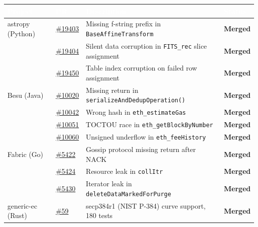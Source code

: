 \documentclass[11pt,a4paper]{article}
\begin{document}
\begin{center}
\begin{tabular}{|p{2.8cm}|p{1.3cm}|p{6.4cm}|p{1.8cm}|}
\hline
\rowcolor{tblheader}
\textcolor{white}{\bfseries Project} & \textcolor{white}{\bfseries PR} & \textcolor{white}{\bfseries Description} & \textcolor{white}{\bfseries Status} \\
\hline
\rowcolor{tblrowwhite}
astropy (Python) & \href{https://github.com/astropy/astropy/pull/19403}{\#19403} & Missing f-string prefix in \texttt{BaseAffineTransform} & \textbf{Merged} \\
\hline
\rowcolor{tblrowalt}
 & \href{https://github.com/astropy/astropy/pull/19404}{\#19404} & Silent data corruption in \texttt{FITS\_rec} slice assignment & \textbf{Merged} \\
\hline
\rowcolor{tblrowwhite}
 & \href{https://github.com/astropy/astropy/pull/19450}{\#19450} & Table index corruption on failed row assignment & \textbf{Merged} \\
\hline
\rowcolor{tblrowalt}
Besu (Java) & \href{https://github.com/hyperledger/besu/pull/10020}{\#10020} & Missing return in \texttt{serializeAndDedupOperation()} & \textbf{Merged} \\
\hline
\rowcolor{tblrowwhite}
 & \href{https://github.com/hyperledger/besu/pull/10042}{\#10042} & Wrong hash in \texttt{eth\_estimateGas} & \textbf{Merged} \\
\hline
\rowcolor{tblrowalt}
 & \href{https://github.com/hyperledger/besu/pull/10051}{\#10051} & TOCTOU race in \texttt{eth\_getBlockByNumber} & \textbf{Merged} \\
\hline
\rowcolor{tblrowwhite}
 & \href{https://github.com/hyperledger/besu/pull/10060}{\#10060} & Unsigned underflow in \texttt{eth\_feeHistory} & \textbf{Merged} \\
\hline
\rowcolor{tblrowalt}
Fabric (Go) & \href{https://github.com/hyperledger/fabric/pull/5422}{\#5422} & Gossip protocol missing return after NACK & \textbf{Merged} \\
\hline
\rowcolor{tblrowwhite}
 & \href{https://github.com/hyperledger/fabric/pull/5424}{\#5424} & Resource leak in \texttt{collItr} & \textbf{Merged} \\
\hline
\rowcolor{tblrowalt}
 & \href{https://github.com/hyperledger/fabric/pull/5430}{\#5430} & Iterator leak in \texttt{deleteDataMarkedForPurge} & \textbf{Merged} \\
\hline
\rowcolor{tblrowwhite}
generic-ec (Rust) & \href{https://github.com/LFDT-Lockness/generic-ec/pull/59}{\#59} & secp384r1 (NIST P-384) curve support, 180 tests & \textbf{Merged} \\
\hline
\end{tabular}
\end{center}
\end{document}
